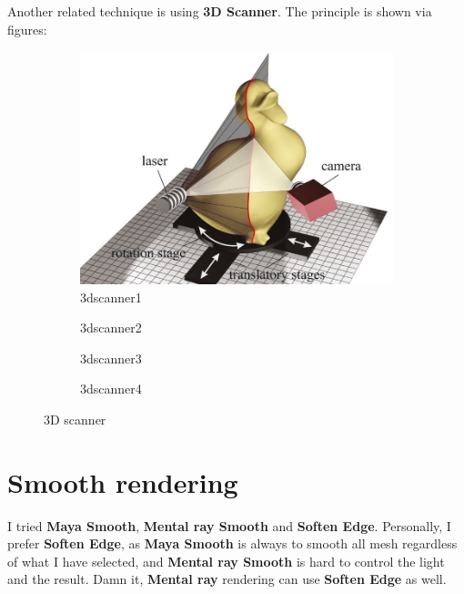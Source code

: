 Another related technique is using \textbf{3D Scanner}. The principle is shown via figures:
\begin{figure}[h]
	\centering
	\begin{subfigure}[b]{0.45\textwidth} %
		\centering
		\includegraphics[width=\textwidth]{figures/3dscanner1}
		\caption{3dscanner1}\label{fig:subfig:3dscanner1}
	\end{subfigure}
	\begin{subfigure}[b]{0.45\textwidth}
		\centering
		\caption{3dscanner2}\label{fig:subfig:3dscanner2}
	\end{subfigure}
	\begin{subfigure}[b]{0.45\textwidth} %
		\centering
		\caption{3dscanner3}\label{fig:subfig:3dscanner3}
	\end{subfigure}
	\begin{subfigure}[b]{0.45\textwidth}
		\centering
		\caption{3dscanner4}\label{fig:subfig:3dscanner4}
	\end{subfigure}
	\caption{3D scanner}
	\vspace{\baselineskip}
\end{figure}

\section{Smooth rendering}
I tried \textbf{Maya Smooth}, \textbf{Mental ray Smooth} and \textbf{Soften Edge}. Personally, I prefer \textbf{Soften Edge}, as \textbf{Maya Smooth} is always to smooth all mesh regardless of what I have selected, and \textbf{Mental ray Smooth} is hard to control the light and the result. Damn it, \textbf{Mental ray} rendering can use \textbf{Soften Edge} as well.

